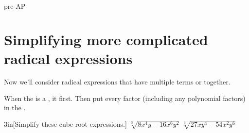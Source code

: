 \begin{taggedblock}{pre-AP}
\section*{Simplifying more complicated radical expressions}
    
Now we'll consider radical expressions that have multiple terms  or  together.

\begin{myCenteredBox}[width=6.5in]
    \large
    When the  is a ,
     it first.
    Then put every factor (including any polynomial factors) in the .
\end{myCenteredBox}


\begin{my2Problems}{3in}[Simplify these cube root expressions.]
    {
        $\sqrt[3]{ 8 x^4 y  -  16 x^6 y^2 }$ 
    }
    {
        $\sqrt[3]{ 27 x y^4  -  54 x^2 y^6 }$ 
    }
\end{my2Problems}
\end{taggedblock}
